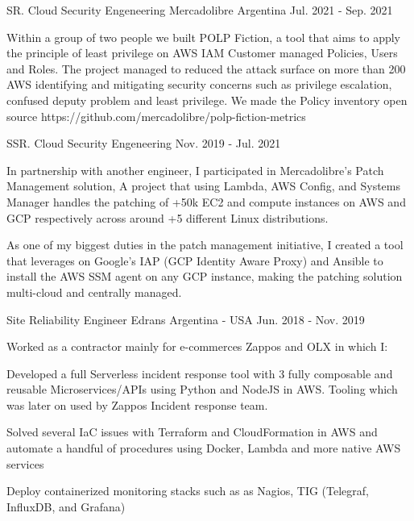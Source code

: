 \begin{cventries}
	\cventry
	{SR. Cloud Security Engeneering} %
	{Mercadolibre} %
	{Argentina} %
	{Jul. 2021 - Sep. 2021} %
	{
		\begin{cvitems} %
			\item {Within a group of two people we built POLP Fiction, a tool that aims to apply the principle of least privilege on AWS IAM Customer managed Policies, Users and Roles. The project managed to reduced the attack surface on more than 200 AWS identifying and mitigating security concerns such as privilege escalation, confused deputy problem and least privilege. We made the Policy inventory open source https://github.com/mercadolibre/polp-fiction-metrics}
		\end{cvitems}
	}
	\cventry
	{SSR. Cloud Security Engeneering} %
	{} %
	{} %
	{Nov. 2019 - Jul. 2021} %
	{
		\begin{cvitems} %
			\item {In partnership with another engineer, I participated in Mercadolibre's Patch Management solution, A project that using Lambda, AWS Config, and Systems Manager handles the patching of +50k EC2 and compute instances on AWS and GCP respectively across around +5 different Linux distributions.}
			\item {As one of my biggest duties in the patch management initiative, I created a tool that leverages on Google's IAP (GCP Identity Aware Proxy) and Ansible to install the AWS SSM agent on any GCP instance, making the patching solution multi-cloud and centrally managed.}
		\end{cvitems}
	}

	\cventry
	{Site Reliability Engineer} %
	{Edrans} %
	{Argentina - USA} %
	{Jun. 2018 - Nov. 2019} %
	{
		{Worked as a contractor mainly for e-commerces Zappos and OLX in which I:}
		\linebreak
		\begin{cvitems} %
			\item {Developed a full Serverless incident response tool with 3 fully composable and reusable Microservices/APIs using Python and NodeJS in AWS. Tooling which was later on used by Zappos Incident response team.}
			\item {Solved several IaC issues with Terraform and CloudFormation in AWS and automate a handful of procedures using Docker, Lambda and more native AWS services}
			\item {Deploy containerized monitoring stacks such as as Nagios, TIG (Telegraf, InfluxDB, and Grafana)}
		\end{cvitems}
	}


\end{cventries}
